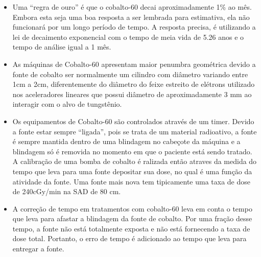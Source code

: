 \documentclass[11pt,a4paper]{article}
\newcounter{exemplo}
\begin{document}
\begin{exemplo}
\begin{itemize}
        \item Uma “regra de ouro” é que o cobalto-60 decai aproximadamente 1\% ao mês. Embora esta seja uma boa resposta a ser lembrada para estimativa, ela não funcionará por um longo período de tempo. A resposta precisa, é utilizando a lei de decaimento exponencial com o tempo de meia vida de 5.26 anos e o tempo de análise igual a 1 mês. 
        
        \item As máquinas de Cobalto-60 apresentam maior penumbra geométrica devido a fonte de cobalto ser normalmente um cilindro com diâmetro variando entre 1cm a 2cm, diferentemente do diâmetro do feixe estreito de elétrons utilizado nos aceleradores lineares que possui diâmetro de aproximadamente 3 mm ao interagir com o alvo de tungstênio.
        
        \item Os equipamentos de Cobalto-60 são controlados através de um timer. Devido a fonte estar sempre ``ligada'', pois se trata de um material radioativo, a fonte é sempre mantida dentro de uma blindagem no cabeçote da máquina e a blindagem só é removida no momento em que o paciente está sendo tratado. A calibração de uma bomba de cobalto é ralizada então atraves da medida do tempo que leva para uma fonte depositar sua dose, no qual é uma função da atividade da fonte. Uma fonte mais nova tem tipicamente uma taxa de dose de 240cGy/min na SAD de 80 cm.

        \item A correção de tempo em tratamentos com cobalto-60 leva em conta o tempo que leva para afastar a blindagem da fonte de cobalto. Por uma fração desse tempo, a fonte não está totalmente exposta e não está fornecendo a taxa de dose total. Portanto, o erro de tempo é adicionado ao tempo que leva para entregar a fonte.

    \end{itemize}
\end{exemplo}
\end{document}
